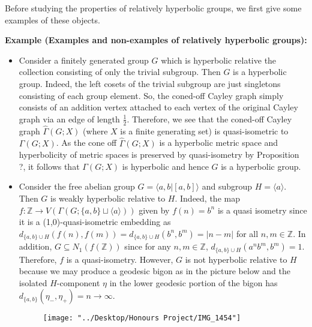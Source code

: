 \documentclass[12pt]{article}
\newcommand{\vs}{\vskip10pt}
\begin{document}
	\vs
	
	Before studying the properties of relatively hyperbolic groups, we first give some examples of these objects. 
	
	\vs 
	
	\textbf{Example (Examples and non-examples of relatively hyperbolic groups): } 
	
	\begin{itemize}
		\item Consider a finitely generated group $G$ which is hyperbolic relative the collection consisting of only the trivial subgroup. Then $G$ is a hyperbolic group. Indeed, the left cosets of the trivial subgroup are just singletons consisting of each group element. So, the coned-off Cayley graph simply consists of an addition vertex attached to each vertex of the original Cayley graph via an edge of length $\frac{1}{2}$. Therefore, we see that the coned-off Cayley graph $\hat{\Gamma}(G; X)$ (where $X$ is a finite generating set) is quasi-isometric to $\Gamma(G;X)$. As the cone off $\hat{\Gamma}(G; X)$ is a hyperbolic metric space and hyperbolicity of metric spaces is preserved by quasi-isometry by Proposition ?, it follows that $\Gamma(G;X)$ is hyperbolic and hence $G$ is a hyperbolic group. 
		\item Consider the free abelian group $G = \langle a,b \vert [a,b] \rangle$ and subgroup $H = \langle a \rangle$. Then $G$ is weakly hyperbolic relative to $H$. Indeed, the map $f: \mathbb{Z} \rightarrow V(\Gamma(G; \{a,b\} \sqcup \langle a \rangle))$ given by $f(n) = b^n$ is a quasi isometry since it is a (1,0)-quasi-isometric embedding as $d_{\{a,b\} \cup H} (f(n),f(m)) = d_{\{a,b\} \cup H} (b^n,b^m) = \vert n - m \vert$ for all $n,m \in \mathbb{Z}$. In addition, $G \subseteq N_1(f(\mathbb{Z}))$ since for any $n,m \in \mathbb{Z}$, $d_{\{a,b\} \cup H}(a^nb^m, b^m) = 1$. Therefore, $f$ is a quasi-isometry. However, $G$ is not hyperbolic relative to $H$ because we may produce a geodesic bigon as in the picture below and the isolated $H$-component $\eta$ in the lower geodesic portion of the bigon has $d_{\{a,b\}} (\eta_{-}, \eta_{+}) = n \rightarrow \infty$. 
		
\begin{figure} [h]
	\centering
	\texttt{[image: "../Desktop/Honours Project/IMG\_1454"]}
	\caption{}
	\label{fig:img1454}
\end{figure}
		

\end{itemize}
\end{document}
